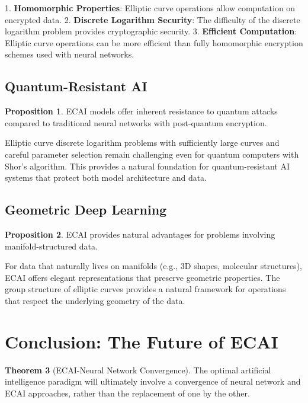 \documentclass[12pt,a4paper]{article}
\theoremstyle{definition}
\newtheorem{theorem}{Theorem}
\newtheorem{proposition}[theorem]{Proposition}
\begin{document}
1. \textbf{Homomorphic Properties}: Elliptic curve operations allow computation on encrypted data.
2. \textbf{Discrete Logarithm Security}: The difficulty of the discrete logarithm problem provides cryptographic security.
3. \textbf{Efficient Computation}: Elliptic curve operations can be more efficient than fully homomorphic encryption schemes used with neural networks.

\subsection{Quantum-Resistant AI}

\begin{proposition}
ECAI models offer inherent resistance to quantum attacks compared to traditional neural networks with post-quantum encryption.
\end{proposition}

Elliptic curve discrete logarithm problems with sufficiently large curves and careful parameter selection remain challenging even for quantum computers with Shor's algorithm. This provides a natural foundation for quantum-resistant AI systems that protect both model architecture and data.

\subsection{Geometric Deep Learning}

\begin{proposition}
ECAI provides natural advantages for problems involving manifold-structured data.
\end{proposition}

For data that naturally lives on manifolds (e.g., 3D shapes, molecular structures), ECAI offers elegant representations that preserve geometric properties. The group structure of elliptic curves provides a natural framework for operations that respect the underlying geometry of the data.

\section{Conclusion: The Future of ECAI}

\begin{theorem}[ECAI-Neural Network Convergence]
The optimal artificial intelligence paradigm will ultimately involve a convergence of neural network and ECAI approaches, rather than the replacement of one by the other.
\end{theorem}
\end{document}
